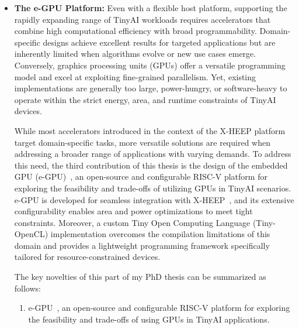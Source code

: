 \begin{itemize}
            Together, these contributions position \mbox{X-HEEP} as a versatile and silicon-ready host platform that bridges the gap between accelerator prototyping and full system deployment. By combining a modular RISC-V architecture with a highly adaptable accelerator interface and extensive internal configurability, \mbox{X-HEEP} enables seamless integration of diverse computing engines while supporting comprehensive design-space exploration across FPGA, ASIC, and mixed modeling workflows.
        
            \item \textbf{The e-GPU Platform:} Even with a flexible host platform, supporting the rapidly expanding range of TinyAI workloads requires accelerators that combine high computational efficiency with broad programmability. Domain-specific designs achieve excellent results for targeted applications but are inherently limited when algorithms evolve or new use cases emerge. Conversely, graphics processing units (GPUs) offer a versatile programming model and excel at exploiting fine-grained parallelism. Yet, existing implementations are generally too large, power-hungry, or software-heavy to operate within the strict energy, area, and runtime constraints of TinyAI devices.
            
            While most accelerators introduced in the context of the \mbox{X-HEEP} platform target domain-specific tasks, more versatile solutions are required when addressing a broader range of applications with varying demands. To address this need, the third contribution of this thesis is the design of the embedded GPU (\mbox{e-GPU})~\cite{e-gpu}, an open-source and configurable RISC-V platform for exploring the feasibility and trade-offs of utilizing GPUs in TinyAI scenarios. \mbox{e-GPU} is developed for seamless integration with \mbox{X-HEEP}~\cite{x-heep}, and its extensive configurability enables area and power optimizations to meet tight constraints. Moreover, a custom Tiny Open Computing Language (Tiny-OpenCL) implementation overcomes the compilation limitations of this domain and provides a lightweight programming framework specifically tailored for resource-constrained devices.
        
            The key novelties of this part of my PhD thesis can be summarized as follows:
        
            \begin{enumerate}[label=(\alph*)]
                \item \mbox{e-GPU}~\cite{e-gpu}, an open-source and configurable RISC-V platform for exploring the feasibility and trade-offs of using GPUs in TinyAI applications.


\end{enumerate}
\end{itemize}
